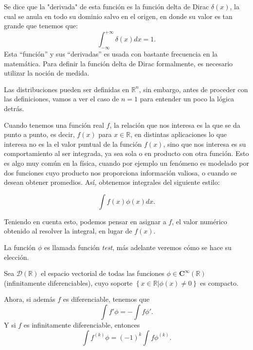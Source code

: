 \documentclass[letter,12pt]{article}
\begin{document}
Se dice que la "derivada" de esta función es la función delta de Dirac $ \delta(x) $, la cual se anula en todo su dominio salvo en el origen, en donde su valor es tan grande que tenemos que:
\begin{equation}
	\int_{-\infty}^{+\infty}\delta(x) dx = 1.
\end{equation} 
Esta ``función'' y sus ``derivadas'' es usada con bastante frecuencia en la matemática.
Para definir la función delta de Dirac formalmente, es necesario utilizar la noción de medida.

Las distribuciones pueden ser definidas en $ \mathbb{R}^n $, sin embargo, antes de proceder con las definiciones, vamos a ver el caso de $ n =1 $ para entender un poco la lógica detrás.

Cuando tenemos una función real $ f $, la relación que nos interesa es la que se da
punto a punto, es decir, $ f(x) $ para $ x \in \mathbb{R} $, 
en distintas aplicaciones lo que interesa no es la el valor puntual de la función 
$ f(x) $, sino que nos interesa es su comportamiento al ser integrada, ya sea sola 
o en producto con otra función. Esto es algo muy común en la física, cuando 
por ejemplo un fenómeno es modelado por dos funciones cuyo producto nos
proporciona información valiosa, o cuando se desean obtener promedios. 
Así, obtenemos integrales del siguiente estilo:

\begin{equation}
	\int{f(x)\phi(x)}dx.
\end{equation}

Teniendo en cuenta esto, podemos pensar en asignar a $ f $, el valor numérico obtenido 
al resolver la integral, en lugar de $ f(x) $.

La función $ \phi $ es llamada función \textit{test}, más adelante veremos cómo se hace 
su elección.

Sea $ \mathscr{D}(\mathbb{R}) $ el espacio vectorial de todas las funciones 
$ \phi \in \mathbf{C}^\infty (\mathbb{R}) $ (infinitamente diferenciables), cuyo soporte
$ \left\{ x\in \mathbb{R}| \phi(x) \neq 0 \right\} $ es compacto.

Ahora, si además $ f $ es diferenciable, tenemos que
\begin{equation}\label{intro:first}
	\int{f'\phi} = - \int{f\phi '}.
\end{equation}
Y si $ f $ es infinitamente diferenciable, entonces
\begin{equation}\label{intro:second}
	\int{f^{(k)}\phi} = (-1)^k \int{f\phi^{(k)}}.
\end{equation}
\end{document}
